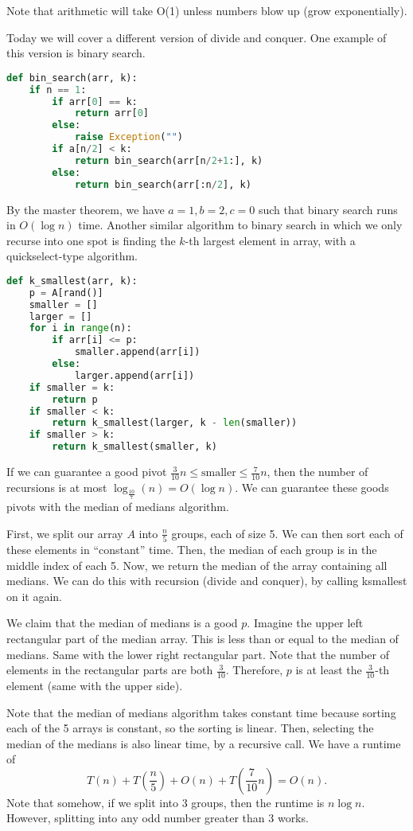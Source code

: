 
Note that arithmetic will take O(1) unless numbers blow up (grow exponentially).

Today we will cover a different version of divide and conquer. One example of this version is binary search.

\begin{lstlisting}[language=Python]
def bin_search(arr, k):
	if n == 1:
		if arr[0] == k:
			return arr[0]
		else:
			raise Exception("")
		if a[n/2] < k:
			return bin_search(arr[n/2+1:], k)
		else:
			return bin_search(arr[:n/2], k)
\end{lstlisting}

By the master theorem, we have \( a=1, b=2, c=0 \) such that binary search runs in \( O(\log n) \) time. Another similar algorithm to binary search in which we only recurse into one spot is finding the \( k \)-th largest element in array, with a quickselect-type algorithm.

\begin{lstlisting}[language=Python]
def k_smallest(arr, k):
	p = A[rand()]
	smaller = []
	larger = []
	for i in range(n):
		if arr[i] <= p:
			smaller.append(arr[i])
		else:
			larger.append(arr[i])
	if smaller = k:
		return p
	if smaller < k:
		return k_smallest(larger, k - len(smaller))
	if smaller > k:
		return k_smallest(smaller, k)
\end{lstlisting}

If we can guarantee a good pivot \( \frac{3}{10}n \le \text{smaller} \le \frac{7}{10}n \), then the number of recursions is at most \( \log _{\frac{10}{7}}(n) = O(\log n) \). We can guarantee these goods pivots with the median of medians algorithm.

First, we split our array \( A \) into \( \frac{n}{5} \) groups, each of size 5. We can then sort each of these elements in ``constant'' time. Then, the median of each group is in the middle index of each 5. Now, we return the median of the array containing all medians. We can do this with recursion (divide and conquer), by calling ksmallest on it again.

We claim that the median of medians is a good \( p \). Imagine the upper left rectangular part of the median array. This is less than or equal to the median of medians. Same with the lower right rectangular part. Note that the number of elements in the rectangular parts are both \( \frac{3}{10} \). Therefore, \( p \) is at least the \( \frac{3}{10} \)-th element (same with the upper side).

Note that the median of medians algorithm takes constant time because sorting each of the 5 arrays is constant, so the sorting is linear. Then, selecting the median of the medians is also linear time, by a recursive call. We have a runtime of \[
	T(n) + T\left(\frac{n}{5}\right) + O(n) + T\left(\frac{7}{10}n\right) = O(n)
.\] Note that somehow, if we split into 3 groups, then the runtime is \( n\log n \). However, splitting into any odd number greater than 3 works.
